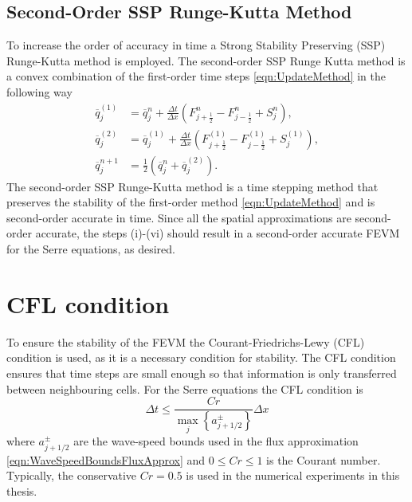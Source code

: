 \subsection{Second-Order SSP Runge-Kutta Method}
To increase the order of accuracy in time a Strong Stability Preserving (SSP) Runge-Kutta method \cite{Gottlieb-etal-2003-89} is employed. The second-order SSP Runge Kutta method is a convex combination of the first-order time steps \eqref{eqn:UpdateMethod} in the following way
\begin{subequations}
\begin{align}
\overline{q}_j^{(1)} &= \overline{q}^{n}_j + \frac{\Delta t}{\Delta x} \left(F^n_{j+\frac{1}{2}} - F^n_{j-\frac{1}{2}} + S^n_j\right),\\
\overline{q}_j^{(2)} &= \overline{q}_j^{(1)} + \frac{\Delta t}{\Delta x} \left(F_{j+\frac{1}{2}}^{(1)} - F_{j-\frac{1}{2}}^{(1)}  + S_j^{(1)} \right), \\
\overline{q}^{n+1}_j &= \frac{1}{2} \left( \overline{q}^n_j +  \overline{q}_j^{(2)}  \right).
\end{align}
\label{eqn:SSPRKStep1}
\end{subequations}
The second-order SSP Runge-Kutta method is a time stepping method that preserves the stability of the first-order method \eqref{eqn:UpdateMethod} and is second-order accurate in time. Since all the spatial approximations are second-order accurate, the steps (i)-(vi) should result in a second-order accurate FEVM for the Serre equations, as desired. 


\section{CFL condition}
To ensure the stability of the FEVM the Courant-Friedrichs-Lewy (CFL) condition \cite{Courant-etal-1967-215} is used, as it is a necessary condition for stability. The CFL condition ensures that time steps are small enough so that information is only transferred between neighbouring cells. For the Serre equations the CFL condition is 
\begin{equation}
\Delta t \le \frac{Cr }{\max_{j} \left\lbrace a^\pm_{j+1/2} \right\rbrace} \Delta x
\label{eqn:CFLcond}
\end{equation}
where $a^\pm_{j+1/2} $ are the wave-speed bounds used in the flux approximation \eqref{eqn:WaveSpeedBoundsFluxApprox} and $0\le Cr \le 1$ is the Courant number. Typically, the conservative $Cr = 0.5$ is used in the numerical experiments in this thesis. 

